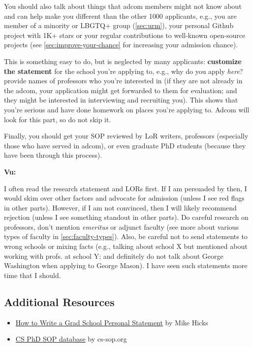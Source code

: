 \documentclass[oneside,11pt]{book}
\newenvironment{commentbox}[1][]{
  \small
  \begin{mybox}
    {\small \textbf{#1}}
  }{
  \end{mybox}
}
\begin{document}
You should also talk about things that adcom members might not know about and can help make you different than the other 1000 applicants, e.g., you are member of a minority or LBGTQ+ group (\autoref{sec:urm}), your personal Github project with 1K+ stars or your regular contributions to well-known open-source projects (see \autoref{sec:improve-your-chance} for increasing your admission chance).


This is something easy to do, but is neglected by many
applicants: \textbf{customize the statement} for the school you're applying to,
e.g., why do you apply \emph{here}? provide names of professors who you're interested in (if they are not already in the adcom, your application might get forwarded to them for evaluation; and they might be interested in interviewing and recruiting you).
This shows that you're serious and have done homework on places you're applying to.
Adcom will look for this part, so do not skip it.

Finally, you should get your SOP reviewed by LoR writers, professors (especially those who have served in adcom), or even graduate PhD students (because they have been through this process).  

\begin{commentbox}[Vu:]
  I often read the research statement and LORs first. If I am
  persuaded by then, I would skim over other factors and advocate for
  admission (unless I see red flags in other parts). However, if I am not
  convinced, then I will likely recommend rejection (unless I see
  something standout in other parts).
  \tcblower
  Do careful research on professors, don't mention \emph{emeritus} or  adjunct faculty (see more about various types of faculty in \autoref{sec:faculty-types}).
  Also, be careful not to send statements to wrong schools or mixing
  facts (e.g., talking about school X but mentioned about working with
  profs. at school Y; and definitely do not talk about George Washington when applying to George Mason). I have seen such statements more time that I
  should.
\end{commentbox}




\subsection*{Additional Resources}
\begin{itemize}
  \item \href{http://www.pl-enthusiast.net/2022/10/03/how-to-write-a-grad-school-personal-statement/}{How to Write a Grad School Personal Statement} by Mike Hicks
  \item     \href{https://cs-sop.notion.site/cs-sop/CS-PhD-Statements-of-Purpose-df39955313834889b7ac5411c37b958d?p=f5d5980a71524ebaa4e6ae57266b847c&pm=s}{CS PhD SOP database} by cs-sop.org
\end{itemize}
\end{document}
